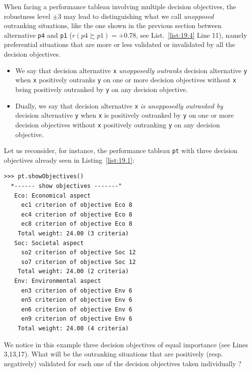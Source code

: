 When facing a performance tableau involving multiple decision objectives, the robustness level $\pm 3$  may lead to distinguishing what we call \emph{unopposed} outranking situations, like the one shown in the previous section between alternative \texttt{p4} and \texttt{p1} ($r(p4 \succsim p1) = +0.78$, see List.~\vref{list:19.4} Line 11), namely preferential situations that are more or less validated or invalidated by all the decision objectives.  

\begin{definition}\label{def:19.2}
\begin{itemize}
\item We say that decision alternative \texttt{x} \emph{unopposedly outranks} decision alternative \texttt{y} when  \texttt{x} positively outranks \texttt{y} on one or more decision objectives without \texttt{x} being positively outranked by \texttt{y} on any decision objective.
\item Dually, we say that decision alternative \texttt{x} \emph{is unopposedly outranked by} decision alternative \texttt{y} when \texttt{x} is positively outranked by \texttt{y} on one or more decision objectives without \texttt{x} positively outranking \texttt{y} on any decision objective.
\end{itemize}
\end{definition}

Let us reconsider, for instance, the performance tableau \texttt{pt} with three decision objectives already seen in Listing~\vref{list:19.1}:
\begin{lstlisting}
>>> pt.showObjectives()
  *------ show objectives -------"
   Eco: Economical aspect
     ec1 criterion of objective Eco 8
     ec4 criterion of objective Eco 8
     ec8 criterion of objective Eco 8
    Total weight: 24.00 (3 criteria)
   Soc: Societal aspect
     so2 criterion of objective Soc 12
     so7 criterion of objective Soc 12
    Total weight: 24.00 (2 criteria)
   Env: Environmental aspect
     en3 criterion of objective Env 6
     en5 criterion of objective Env 6
     en6 criterion of objective Env 6
     en9 criterion of objective Env 6
    Total weight: 24.00 (4 criteria)
\end{lstlisting}

We notice in this example three decision objectives of equal importance (see Lines 3,13,17). What will be the outranking situations that are positively (resp.  negatively) validated for each one of the decision objectives taken individually ?

